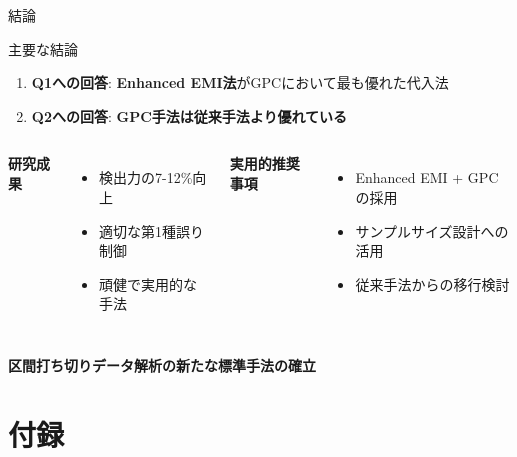 \documentclass[11pt,aspectratio=169]{beamer}
\begin{document}
\begin{frame}{結論}
\begin{alertblock}{主要な結論}
\begin{enumerate}
\item \textbf{Q1への回答}: \textcolor{accent}{\textbf{Enhanced EMI法}}がGPCにおいて最も優れた代入法

\item \textbf{Q2への回答}: \textcolor{primary}{\textbf{GPC手法は従来手法より優れている}}
\end{enumerate}
\end{alertblock}

\vspace{1em}

\begin{columns}
\textbf{研究成果}
\begin{itemize}
\item 検出力の7-12\%向上
\item 適切な第1種誤り制御
\item 頑健で実用的な手法
\end{itemize}

\textbf{実用的推奨事項}
\begin{itemize}
\item Enhanced EMI + GPC の採用
\item サンプルサイズ設計への活用
\item 従来手法からの移行検討
\end{itemize}
\end{columns}

\vspace{1em}

\begin{center}
\textcolor{accent}{\Large \textbf{区間打ち切りデータ解析の新たな標準手法の確立}}
\end{center}
\end{frame}

\section*{付録}
\end{document}
